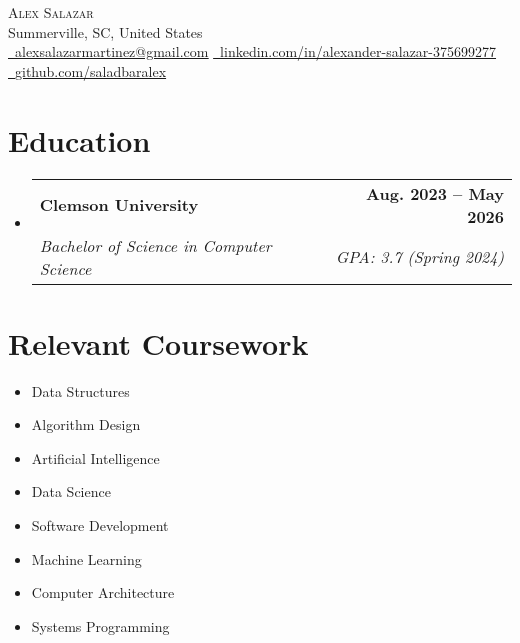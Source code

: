 \documentclass[letterpaper,11pt]{article}
\makeatletter
\newcommand{\resumeSubheading}[4]{
  \vspace{-2pt}\item[]
    \begin{tabular*}{1.0\textwidth}[t]{l@{\extracolsep{\fill}}r}
      \textbf{#1} & \textbf{\small #2} \\
      \textit{\small#3} & \textit{\small #4} \\
    \end{tabular*}\vspace{-7pt}
}
\makeatother
\begin{document}
\begin{center}
    {\Huge \scshape Alex Salazar} \\ \vspace{1pt}
    Summerville, SC, United States \\ \vspace{1pt}
    \small \href{mailto:alexsalazarmartinez@gmail.com}{\faEnvelope\ \underline{alexsalazarmartinez@gmail.com}} \hspace{0.3cm}
    \href{https://www.linkedin.com/in/alexander-salazar-375699277}{\faLinkedin\ \underline{linkedin.com/in/alexander-salazar-375699277}} \hspace{0.3cm}
    \href{https://github.com/saladbaralex}{\faGithub\ \underline{github.com/saladbaralex}}
    \vspace{-8pt}
\end{center}

\section{Education}
\begin{itemize}  %
    \resumeSubheading{Clemson University}{Aug. 2023 -- May 2026}{Bachelor of Science in Computer Science}{GPA: 3.7 (Spring 2024)}
\end{itemize}

\section{Relevant Coursework}
\begin{multicols}{4}
    \begin{itemize}[itemsep=-5pt, parsep=3pt]
        \item Data Structures
        \item Algorithm Design
        \item Artificial Intelligence
        \item Data Science
        \item Software Development
        \item Machine Learning
        \item Computer Architecture
        \item Systems Programming
    \end{itemize}
\end{multicols}

\end{document}
